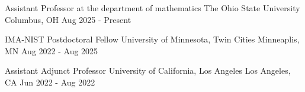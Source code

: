 
\vspace{0.2cm}

\begin{cventries}

\cventryshort
    {Assistant Professor at the department of mathematics} %
    {The Ohio State University} %
    {Columbus, OH} %
    {Aug 2025 - Present} %

  \cventryshort
    {IMA-NIST Postdoctoral Fellow} %
    {University of Minnesota, Twin Cities} %
    {Minneaplis, MN} %
    {Aug 2022 - Aug 2025} %

  \cventryshort
    {Assistant Adjunct Professor} %
    {University of California, Los Angeles} %
    {Los Angeles, CA} %
    {Jun 2022 - Aug 2022} %

\end{cventries}
